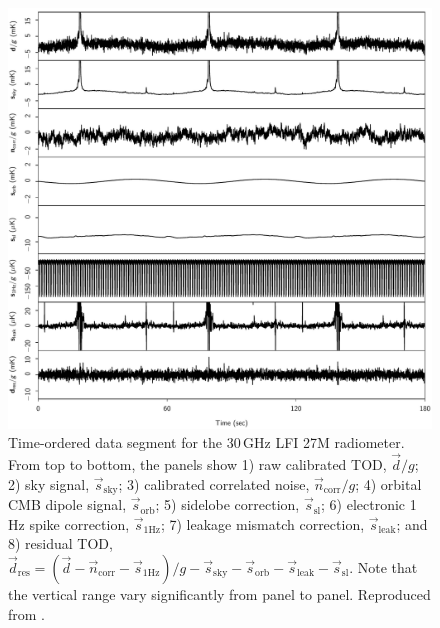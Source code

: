 \documentclass[twocolumn]{aa}
\renewcommand{\d}[0]{\vec{d}}
\newcommand{\n}[0]{\vec{n}}
\newcommand{\s}[0]{\vec{s}}
\begin{document}
\begin{figure}[t]
  \center
  \includegraphics[width=\linewidth]{figs/tod_27M_pid1000_v1.pdf}
  \caption{Time-ordered data segment for the 30\,GHz LFI 27M
    radiometer. From top to bottom, the panels show 1) raw calibrated
    TOD, $\d/g$; 2) sky signal, $\s_{\mathrm{sky}}$; 3) calibrated
    correlated noise, $\n_{\mathrm{corr}}/g$; 4) orbital CMB dipole
    signal, $\s_{\mathrm{orb}}$; 5) sidelobe correction,
    $\s_{\mathrm{sl}}$; 6) electronic 1\,Hz spike correction,
    $\s_{\mathrm{1Hz}}$; 7) leakage mismatch correction,
    $\s_{\mathrm{leak}}$; and 8) residual TOD, $\d_{\mathrm{res}} =
    (\d-\n_{\mathrm{corr}} - \s_{\mathrm{1Hz}})/g - \s_{\mathrm{sky}}
    - \s_{\mathrm{orb}} - \s_{\mathrm{leak}} - \s_{\mathrm{sl}}$. Note
    that the vertical range vary significantly from panel to
    panel. Reproduced from \citet{bp10}.}
  \label{fig:todplot}
\end{figure}
\end{document}

